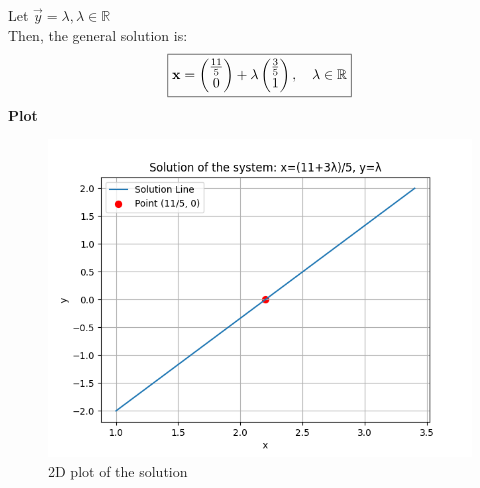 \documentclass[14pt]{extarticle}
\begin{document}
Let \(\vec{y} = \lambda, \lambda \in \mathbb{R}\) \\
Then, the general solution is:
\[
\boxed{
\mathbf{x} = \begin{pmatrix}\frac{11}{5} \\ 0\end{pmatrix} + \lambda \begin{pmatrix}\frac{3}{5} \\ 1\end{pmatrix}, \quad \lambda \in \mathbb{R}
}
\]
{\Large \textbf{Plot}}
\begin{figure}[!h]\centering
\includegraphics[width=0.9\columnwidth]{Figs/Figure_1.png}
\caption{2D plot of the solution}
\label{fig:plt}
\end{figure}
\end{document}
